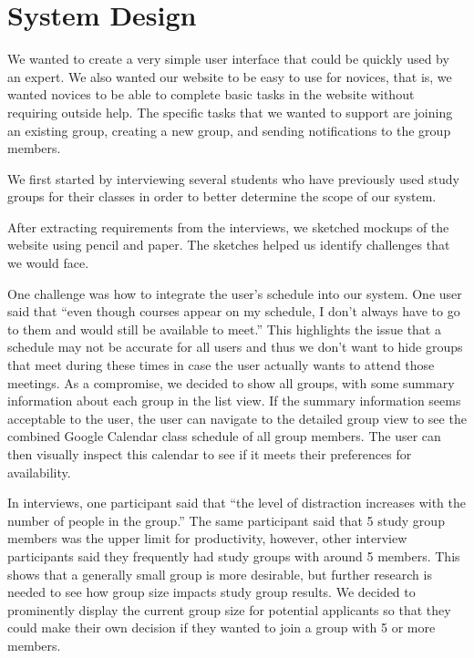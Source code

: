 \documentclass[conference]{IEEEtran}
\begin{document}
\section{System Design}



We wanted to create a very simple user interface that could be quickly used by an expert.
We also wanted our website to be easy to use for novices, that is, we wanted novices to be able to complete basic tasks in the website without requiring outside help.
The specific tasks that we wanted to support are joining an existing group, creating a new group, and sending notifications to the group members.

We first started by interviewing several students who have previously used study groups for their classes in order to better determine the scope of our system.

After extracting requirements from the interviews, we sketched mockups of the website using pencil and paper.
The sketches helped us identify challenges that we would face.

One challenge was how to integrate the user's schedule into our system.
One user said that ``even though courses appear on my schedule, I don't always have to go to them and would still be available to meet.''
This highlights the issue that a schedule may not be accurate for all users and thus we don't want to hide groups that meet during these times in case the user actually wants to attend those meetings.
As a compromise, we decided to show all groups, with some summary information about each group in the list view.  If the summary information seems acceptable to the user, the user can navigate to the detailed group view to see the combined Google Calendar class schedule of all group members.  The user can then visually inspect this calendar to see if it meets their preferences for availability.



In interviews, one participant said that ``the level of distraction increases with the number of people in the group.''
The same participant said that 5 study group members was the upper limit for productivity, however, other interview participants said they frequently had study groups with around 5 members.
This shows that a generally small group is more desirable, but further research is needed to see how group size impacts study group results.
We decided to prominently display the current group size for potential applicants so that they could make their own decision if they wanted to join a group with 5 or more members.
\end{document}

